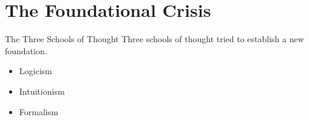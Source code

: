 \documentclass{beamer}
\begin{document}
\section{The Foundational Crisis}
\begin{frame}{The Three Schools of Thought}
Three schools of thought tried to establish a new foundation.
\begin{itemize}
	\item Logicism
	\item Intuitionism
	\item Formalism
\end{itemize}
\vspace{.5\baselineskip}
\end{frame}
\end{document}
